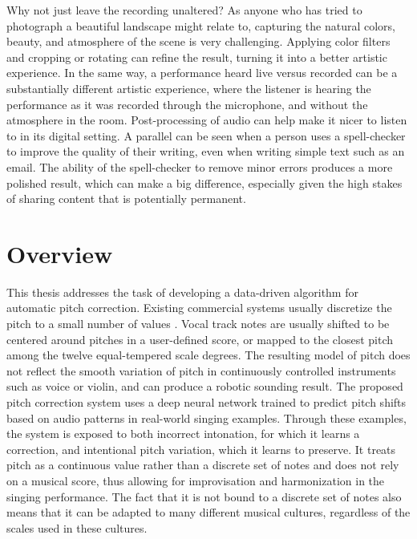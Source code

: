 Why not just leave the recording unaltered? As anyone who has tried to photograph a beautiful landscape might relate to, capturing the natural colors, beauty, and atmosphere of the scene is very challenging. Applying color filters and cropping or rotating can refine the result, turning it into a better artistic experience. In the same way, a performance heard live versus recorded can be a substantially different artistic experience, where the listener is hearing the performance as it was recorded through the microphone, and without the atmosphere in the room. Post-processing of audio can help make it nicer to listen to in its digital setting. A parallel can be seen when a person uses a spell-checker to improve the quality of their writing, even when writing simple text such as an email. The ability of the spell-checker to remove minor errors produces a more polished result, which can make a big difference, especially given the high stakes of sharing content that is potentially permanent. %

\section{Overview}
This thesis addresses the task of developing a data-driven algorithm for automatic pitch correction. Existing commercial systems usually discretize the pitch to a small number of values \cite{antares:2016}. Vocal track notes are usually shifted to be centered around pitches in a user-defined score, or mapped to the closest pitch among the twelve equal-tempered scale degrees. The resulting model of pitch does not reflect the smooth variation of pitch in continuously controlled instruments such as voice or violin, and can produce a robotic sounding result. The proposed pitch correction system uses a deep neural network trained to predict pitch shifts based on audio patterns in real-world singing examples. Through these examples, the system is exposed to both incorrect intonation, for which it learns a correction, and intentional pitch variation, which it learns to preserve. It treats pitch as a continuous value rather than a discrete set of notes and does not rely on a musical score, thus allowing for improvisation and harmonization in the singing performance. The fact that it is not bound to a discrete set of notes also means that it can be adapted to many different musical cultures, regardless of the scales used in these cultures. 

